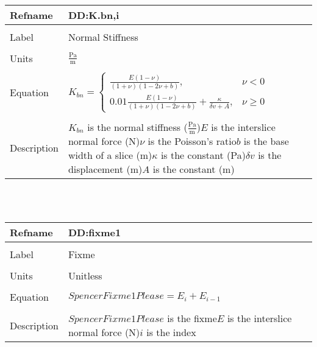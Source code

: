 \documentclass[12pt]{article}
\begin{document}
\noindent \begin{minipage}{\textwidth}
\begin{tabular}{p{} p{}}
\toprule \textbf{Refname} & \textbf{DD:K.bn,i}
\label{DD:K.bn,i}
\\ \midrule \\
Label & Normal Stiffness
\\ \midrule \\
Units & $\frac{\text{Pa}}{\text{m}}$
\\ \midrule \\
Equation & ${K_{bn}}=\begin{cases}
\frac{E \left(1-ν\right)}{\left(1+ν\right) \left(1-2 ν+b\right)}, & ν<0\\
0.01 \frac{E \left(1-ν\right)}{\left(1+ν\right) \left(1-2 ν+b\right)}+\frac{κ}{δv+A}, & ν\geq{}0
\end{cases}$
\\ \midrule \\
Description & ${K_{bn}}$ is the normal stiffness ($\frac{\text{Pa}}{\text{m}}$)\newline$E$ is the interslice normal force (N)\newline$ν$ is the Poisson's ratio\newline$b$ is the base width of a slice (m)\newline$κ$ is the constant (Pa)\newline$δv$ is the displacement (m)\newline$A$ is the constant (m)
\\ \bottomrule \end{tabular}
\end{minipage}\\
~\newline
\noindent \begin{minipage}{\textwidth}
\begin{tabular}{p{} p{}}
\toprule \textbf{Refname} & \textbf{DD:fixme1}
\label{DD:fixme1}
\\ \midrule \\
Label & Fixme
\\ \midrule \\
Units & Unitless
\\ \midrule \\
Equation & $SpencerFixme1Please=E_{i}+E_{i-1}$
\\ \midrule \\
Description & $SpencerFixme1Please$ is the fixme\newline$E$ is the interslice normal force (N)\newline$i$ is the index
\\ \bottomrule \end{tabular}
\end{minipage}\\
\end{document}
